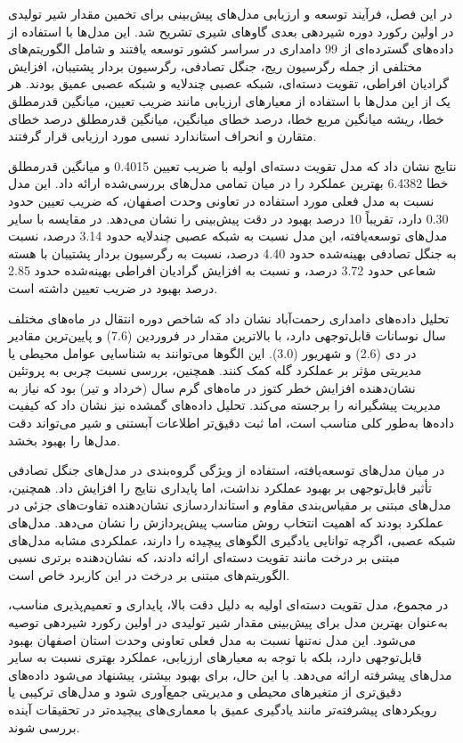 در این فصل، فرآیند توسعه و ارزیابی مدل‌های پیش‌بینی برای تخمین مقدار شیر تولیدی در اولین رکورد دوره شیردهی بعدی گاوهای شیری تشریح شد. این مدل‌ها با استفاده از داده‌های گسترده‌ای از 99 دامداری در سراسر کشور توسعه یافتند و شامل الگوریتم‌های مختلفی از جمله رگرسیون ریج، جنگل تصادفی، رگرسیون بردار پشتیبان، افزایش گرادیان افراطی، تقویت دسته‌ای، شبکه عصبی چندلایه و شبکه عصبی عمیق بودند. هر یک از این مدل‌ها با استفاده از معیارهای ارزیابی مانند ضریب تعیین، میانگین قدرمطلق خطا، ریشه میانگین مربع خطا، درصد خطای میانگین، میانگین قدرمطلق درصد خطای متقارن و انحراف استاندارد نسبی مورد ارزیابی قرار گرفتند.

نتایج نشان داد که مدل تقویت دسته‌ای اولیه با ضریب تعیین \num{0.4015} و میانگین قدرمطلق خطا \num{6.4382} بهترین عملکرد را در میان تمامی مدل‌های بررسی‌شده ارائه داد. این مدل نسبت به مدل فعلی مورد استفاده در تعاونی وحدت اصفهان، که ضریب تعیین حدود \num{0.30} دارد، تقریباً 10 درصد بهبود در دقت پیش‌بینی را نشان می‌دهد. در مقایسه با سایر مدل‌های توسعه‌یافته، این مدل نسبت به شبکه عصبی چندلایه حدود \num{3.14} درصد، نسبت به جنگل تصادفی بهینه‌شده حدود \num{4.40} درصد، نسبت به رگرسیون بردار پشتیبان با هسته شعاعی حدود \num{3.72} درصد، و نسبت به افزایش گرادیان افراطی بهینه‌شده حدود \num{2.85} درصد بهبود در ضریب تعیین داشته است.

تحلیل داده‌های دامداری رحمت‌آباد نشان داد که شاخص دوره انتقال در ماه‌های مختلف سال نوسانات قابل‌توجهی دارد، با بالاترین مقدار در فروردین (\num{7.6}) و پایین‌ترین مقادیر در دی (\num{2.6}) و شهریور (\num{3.0}). این الگوها می‌توانند به شناسایی عوامل محیطی یا مدیریتی مؤثر بر عملکرد گله کمک کنند. همچنین، بررسی نسبت چربی به پروتئین نشان‌دهنده افزایش خطر کتوز در ماه‌های گرم سال (خرداد و تیر) بود که نیاز به مدیریت پیشگیرانه را برجسته می‌کند. تحلیل داده‌های گمشده نیز نشان داد که کیفیت داده‌ها به‌طور کلی مناسب است، اما ثبت دقیق‌تر اطلاعات آبستنی و شیر می‌تواند دقت مدل‌ها را بهبود بخشد.

در میان مدل‌های توسعه‌یافته، استفاده از ویژگی گروه‌بندی در مدل‌های جنگل تصادفی تأثیر قابل‌توجهی بر بهبود عملکرد نداشت، اما پایداری نتایج را افزایش داد. همچنین، مدل‌های مبتنی بر مقیاس‌بندی مقاوم و استانداردسازی نشان‌دهنده تفاوت‌های جزئی در عملکرد بودند که اهمیت انتخاب روش مناسب پیش‌پردازش را نشان می‌دهد. مدل‌های شبکه عصبی، اگرچه توانایی یادگیری الگوهای پیچیده را دارند، عملکردی مشابه مدل‌های مبتنی بر درخت مانند تقویت دسته‌ای ارائه دادند، که نشان‌دهنده برتری نسبی الگوریتم‌های مبتنی بر درخت در این کاربرد خاص است.

در مجموع، مدل تقویت دسته‌ای اولیه به دلیل دقت بالا، پایداری و تعمیم‌پذیری مناسب، به‌عنوان بهترین مدل برای پیش‌بینی مقدار شیر تولیدی در اولین رکورد شیردهی توصیه می‌شود. این مدل نه‌تنها نسبت به مدل فعلی تعاونی وحدت استان اصفهان بهبود قابل‌توجهی دارد، بلکه با توجه به معیارهای ارزیابی، عملکرد بهتری نسبت به سایر مدل‌های پیشرفته ارائه می‌دهد. با این حال، برای بهبود بیشتر، پیشنهاد می‌شود داده‌های دقیق‌تری از متغیرهای محیطی و مدیریتی جمع‌آوری شود و مدل‌های ترکیبی یا رویکردهای پیشرفته‌تر مانند یادگیری عمیق با معماری‌های پیچیده‌تر در تحقیقات آینده بررسی شوند.
